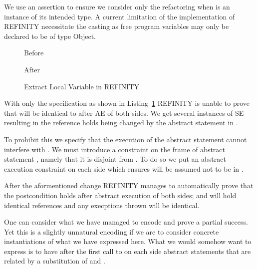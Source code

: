 We use an assertion to ensure we consider only the refactoring when  is an instance of its intended type.
A current limitation of the implementation of REFINITY necessitate the casting  as free program variables may only be declared to be of type Object.
\begin{figure}[tbp]
  \captionsetup{type=lstlisting}
  \centering
  \begin{sublstlisting}[b]{.34\linewidth}
    
    \vspace{-2mm}
    \caption{Before}
    \label{lst:ExtractVariable-refinity-before}
  \end{sublstlisting}\hspace{1cm}
  \begin{sublstlisting}[b]{.34\linewidth}
    
    \vspace{-2mm}
    \caption{After}
    \label{lst:ExtractVariable-refinity-after}
  \end{sublstlisting}\vspace{4mm}
\caption{Extract Local Variable in REFINITY}
\label{lst:ExtractVariable-refinity}
\end{figure}
With only the specification as shown in Listing~\ref{lst:ExtractVariable-refinity} REFINITY is unable to prove that  will be identical to  after AE of both sides.
We get several instances of SE resulting in the reference  holds being changed by the abstract statement  in .

To prohibit this we specify that the execution of the abstract statement  cannot interfere with .
We must introduce a constraint on the frame  of abstract statement , namely that it is disjoint from .
To do so we put an abstract execution constraint  on each side which ensures 
will be assumed not to be in .

After the aformentioned change REFINITY manages to automatically prove that the postcondition holds after abstract execution of both sides;
 and  will hold identical references and any execptions thrown will be identical.

One can consider what we have managed to encode and prove a partial success.
Yet this is a slightly unnatural encoding if we are to consider concrete instantiations of what we have expressed here.
What we would somehow want to express is to have after the first call to  on each side abstract statements that are related by a substitution of  and .

